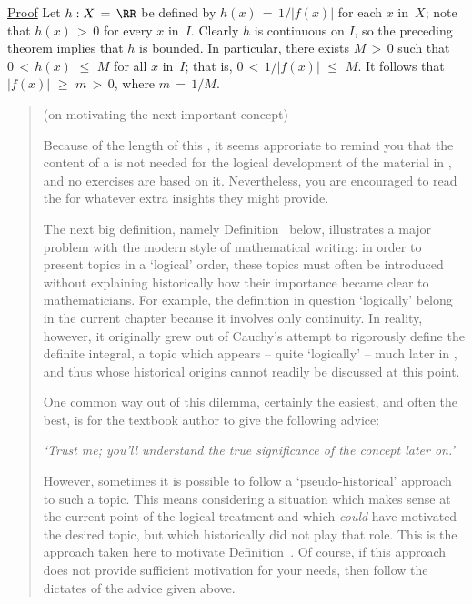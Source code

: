 \V

        \underline{Proof} Let $h:X \,=\, {\RR}$ be defined by $h(x) \,=\, 1/|f(x)|$ for each $x$ in~$X$; note that $h(x)\,>\,0$ for every $x$ in~$I$.
    Clearly $h$ is continuous on $I$, so the preceding theorem implies that $h$ is bounded.
    In particular, there exists $M\,>\,0$ such that $0\,<\,h(x)\,\,{\leq}\,\,M$ for all $x$ in~$I$; that is, $0\,<\,1/|f(x)|\,\,{\leq}\,\,M$.
    It follows that $|f(x)|\,\,{\geq}\,\,m\,>\,0$, where $m \,=\, 1/M$.

\VV


\begin{quotation}
{\footnotesize \underline{\Note} (on motivating the next important concept)

\V

        Because of the length of this {\Note}, it seems approriate to remind you that the content of
    a {\Note} is not needed for the logical development of the material in {\ThisText}, and no exercises are based on it.
    Nevertheless, you are encouraged to read the {\Notes} for whatever extra insights they might provide.

\VV

        The next big definition, namely Definition~ below, illustrates a major problem with the modern style of mathematical writing:
    in order to present topics in a `logical' order, these topics must often be introduced without explaining
    historically how their importance became clear to mathematicians.
    For example, the definition in question `logically' belong in the current chapter because it involves only continuity.
    In reality, however, it originally grew out of Cauchy's attempt to rigorously define the definite integral,
    a topic which appears -- quite `logically' -- much later in {\ThisText}, and thus whose historical origins cannot readily be discussed at this point.

        One common way out of this dilemma, certainly the easiest, and often the best, is for the textbook author to give the following advice:

\VA

       \h {\em `Trust me; you'll understand the true significance of the concept later on.'}

\VA

\noindent However, sometimes it is possible to follow a `pseudo-historical' approach to such a topic.
    This means considering a situation which makes sense at the current point of the logical treatment and which {\em could} have motivated the desired topic,
    but which historically did not play that role. This is the approach taken here to motivate Definition~.
    Of course, if this approach does not provide sufficient motivation for your needs, then follow the dictates of the advice given above.

}
\end{quotation}
